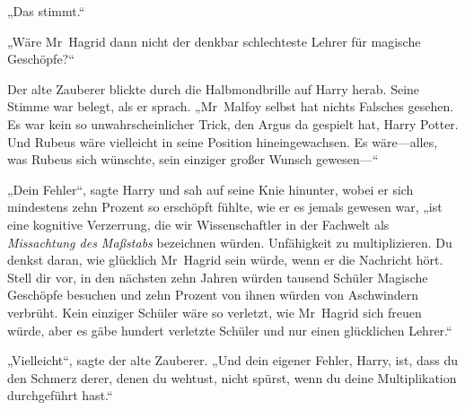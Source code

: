 „Das stimmt.“

„Wäre Mr~Hagrid dann nicht der denkbar schlechteste Lehrer für magische Geschöpfe?“

Der alte Zauberer blickte durch die Halbmondbrille auf Harry herab. Seine Stimme war belegt, als er sprach.
„Mr~Malfoy selbst hat nichts Falsches gesehen. Es war kein so unwahrscheinlicher Trick, den Argus da gespielt hat, Harry Potter. Und Rubeus wäre vielleicht in seine Position hineingewachsen. Es wäre—alles, was Rubeus sich wünschte, sein einziger großer Wunsch gewesen—“

„Dein Fehler“, sagte Harry und sah auf seine Knie hinunter, wobei er sich mindestens zehn Prozent so erschöpft fühlte, wie er es jemals gewesen war, „ist eine kognitive Verzerrung, die wir Wissenschaftler in der Fachwelt als \emph{Missachtung des Maßstabs} bezeichnen würden. Unfähigkeit zu multiplizieren. Du denkst daran, wie glücklich Mr~Hagrid sein würde, wenn er die Nachricht hört. Stell dir vor, in den nächsten zehn Jahren würden tausend Schüler Magische Geschöpfe besuchen und zehn Prozent von ihnen würden von Aschwindern verbrüht. Kein einziger Schüler wäre so verletzt, wie Mr~Hagrid sich freuen würde, aber es gäbe hundert verletzte Schüler und nur einen glücklichen Lehrer.“

„Vielleicht“, sagte der alte Zauberer. „Und dein eigener Fehler, Harry, ist, dass du den Schmerz derer, denen du wehtust, nicht spürst, wenn du deine Multiplikation durchgeführt hast.“

